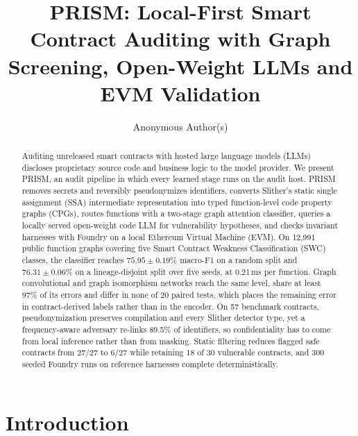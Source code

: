 \documentclass[runningheads]{llncs}
\begin{document}
\title{PRISM: Local-First Smart Contract Auditing with Graph Screening, Open-Weight LLMs and EVM Validation}

\author{Anonymous Author(s)}

\maketitle

\begin{abstract}
Auditing unreleased smart contracts with hosted large language models (LLMs) discloses proprietary source code and business logic to the model provider. We present PRISM, an audit pipeline in which every learned stage runs on the audit host. PRISM removes secrets and reversibly pseudonymizes identifiers, converts Slither's static single assignment (SSA) intermediate representation into typed function-level code property graphs (CPGs), routes functions with a two-stage graph attention classifier, queries a locally served open-weight code LLM for vulnerability hypotheses, and checks invariant harnesses with Foundry on a local Ethereum Virtual Machine (EVM). On 12,991 public function graphs covering five Smart Contract Weakness Classification (SWC) classes, the classifier reaches $75.95\pm0.19\%$ macro-F1 on a random split and $76.31\pm0.06\%$ on a lineage-disjoint split over five seeds, at 0.21\,ms per function. Graph convolutional and graph isomorphism networks reach the same level, share at least 97\% of its errors and differ in none of 20 paired tests, which places the remaining error in contract-derived labels rather than in the encoder. On 57 benchmark contracts, pseudonymization preserves compilation and every Slither detector type, yet a frequency-aware adversary re-links 89.5\% of identifiers, so confidentiality has to come from local inference rather than from masking. Static filtering reduces flagged safe contracts from 27/27 to 6/27 while retaining 18 of 30 vulnerable contracts, and 300 seeded Foundry runs on reference harnesses complete deterministically.

\end{abstract}

\section{Introduction}
\label{sec:intro}
\end{document}
